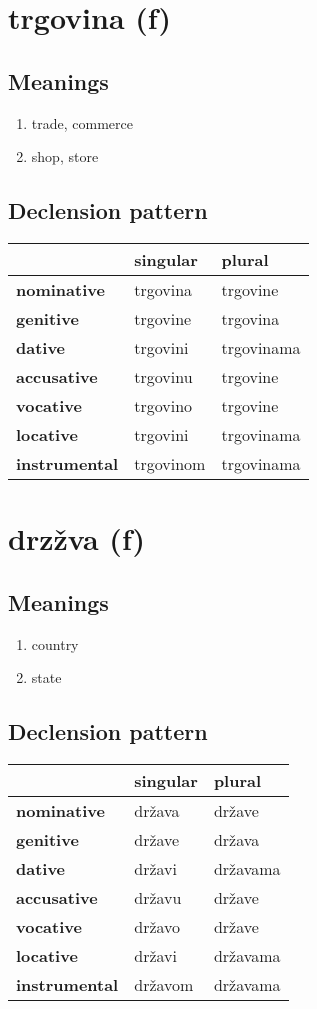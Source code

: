 \filbreak
\section{trgovina (f)}
\subsection*{Meanings}
\begin{enumerate}
\item trade, commerce
\item shop, store
\end{enumerate}
\subsection*{Declension pattern}
\begin{tabularx}{\linewidth}{Xll}
\toprule
{} &   singular &      plural \\
\midrule
\textbf{nominative  } &   trgovina &    trgovine \\
\textbf{genitive    } &   trgovine &    trgovina \\
\textbf{dative      } &   trgovini &  trgovinama \\
\textbf{accusative  } &   trgovinu &    trgovine \\
\textbf{vocative    } &   trgovino &    trgovine \\
\textbf{locative    } &   trgovini &  trgovinama \\
\textbf{instrumental} &  trgovinom &  trgovinama \\
\bottomrule
\end{tabularx}

\filbreak
\section{drzžva (f)}
\subsection*{Meanings}
\begin{enumerate}
\item country
\item state
\end{enumerate}
\subsection*{Declension pattern}
\begin{tabularx}{\linewidth}{Xll}
\toprule
{} & singular &    plural \\
\midrule
\textbf{nominative  } &   država &    države \\
\textbf{genitive    } &   države &    država \\
\textbf{dative      } &   državi &  državama \\
\textbf{accusative  } &   državu &    države \\
\textbf{vocative    } &   državo &    države \\
\textbf{locative    } &   državi &  državama \\
\textbf{instrumental} &  državom &  državama \\
\bottomrule
\end{tabularx}

